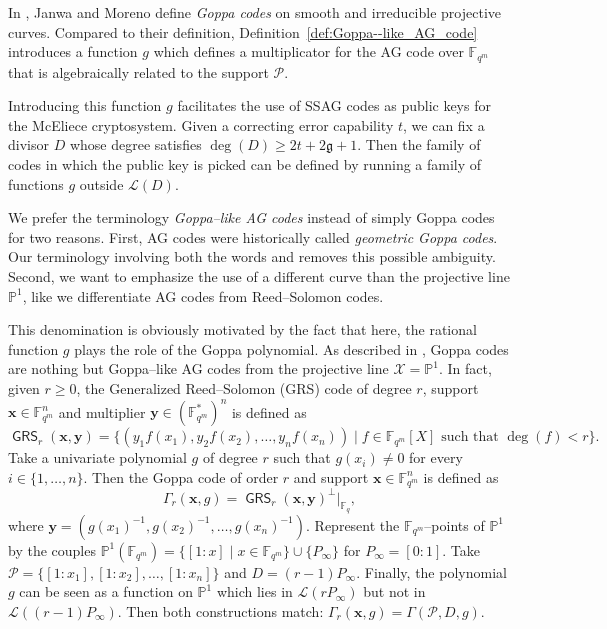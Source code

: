 \documentclass[a4paper]{amsart}
\theoremstyle{definition}
\theoremstyle{remark}
\newcommand{\calP}{\mathcal{P}}
\newcommand{\calL}{\mathcal{L}}
\newcommand{\calX}{\mathcal{X}}
\newcommand{\fqm}{\mathbb{F}_{q^m}}
\newcommand{\fq}{\mathbb{F}_{q}}
\newcommand{\PP}{\mathbb{P}}
\newcommand{\GRS}{\operatorname{\mathsf{GRS}}}
\begin{document}
In \cite{JM96}, Janwa and Moreno define \emph{Goppa codes} on smooth and irreducible projective curves. Compared to their definition, Definition~\ref{def:Goppa--like_AG_code} introduces a function $g$ which defines a multiplicator for the AG code over $\fqm$ that is algebraically related to the support $\calP$.


Introducing this function $g$ facilitates the use of SSAG codes as public keys for the McEliece cryptosystem. Given a correcting error capability $t$, we can fix a divisor $D$ whose degree satisfies $\deg (D) \geq 2t + 2\mathfrak{g}+1$. Then the family of codes in which the public key is picked can be defined by running a family of functions $g$ outside $\calL(D)$.


\medskip

We prefer the terminology \emph{Goppa--like AG codes} instead of simply Goppa codes for two reasons. First, AG codes were historically called \textit{geometric Goppa codes}. Our terminology involving both the words  and  removes this possible ambiguity. Second, we want to emphasize the use of a different curve than the projective line $\PP^1$, like we differentiate AG codes from Reed--Solomon codes.

This denomination is obviously motivated by the fact that here, the rational function $g$ plays the role of the Goppa polynomial. As described in \cite[Example~9.1.8]{Sti09}, Goppa codes are nothing but Goppa--like AG codes from the projective line $\calX=\PP^1$. In fact, given $r \geq 0$, the Generalized Reed--Solomon (GRS) code of degree $r$, support $\mathbf{x} \in \fqm^n$ and multiplier $\mathbf{y} \in (\fqm^*)^n$ is defined as
\[\GRS_r(\mathbf{x},\mathbf{y})=\{(y_1f(x_1),y_2f(x_2),\dots,y_nf(x_n)) \mid f \in \fqm[X] \text{ such that } \deg (f) < r \}.\]
Take a univariate polynomial $g$ of degree $r$ such that $g(x_i) \neq 0$ for every  $i \in \{1,\dots,n\}$. Then the Goppa code of order $r$ and support $\mathbf{x} \in \fqm^n$ is defined as
\begin{equation}\label{eq:classical_Goppa}
\Gamma_r(\mathbf{x},g)= \GRS_r(\mathbf{x},\mathbf{y})^\perp|_{\fq},
	\end{equation}
where $\mathbf{y}=(g(x_1)^{-1},g(x_2)^{-1},\dots,g(x_n)^{-1})$.
Represent the $\fqm$--points of $\PP^1$ by the couples $\PP^1(\fqm)=\{[1:x] \mid x \in \fqm\} \cup \{P_\infty\}$ for $P_\infty=[0:1]$. Take $\calP=\{[1:x_1],[1:x_2],\dots,[1:x_n]\}$ and $D=(r-1)P_\infty$. Finally, the polynomial $g$ can be seen as a function on $\PP^1$ which lies in $\calL(rP_\infty)$ but not in $\calL((r-1)P_\infty)$. Then both constructions match: $\Gamma_r(\mathbf{x},g)=\Gamma(\calP,D,g)$.
\end{document}
